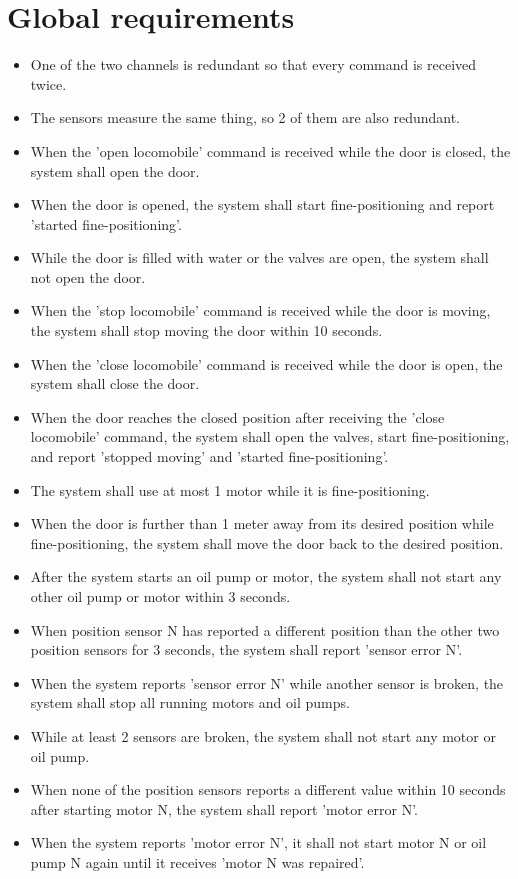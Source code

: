 \documentclass{article}
\begin{document}
\section{Global requirements}
\begin{itemize}
    \item One of the two channels is redundant so that every command is received twice. 
    \item The sensors measure the same thing, so 2 of them are also redundant. 

    \item When the 'open locomobile' command is received while the door is closed,
    the system shall open the door.
    \item When the door is opened, the system shall start fine-positioning and
    report 'started fine-positioning'.
    \item While the door is filled with water or the valves are open, the system 
    shall not open the door.

    \item When the 'stop locomobile' command is received while the door is moving,
    the system shall stop moving the door within 10 seconds.

    \item When the 'close locomobile' command is received while the door is open,
    the system shall close the door.
    \item When the door reaches the closed position after receiving the 
    'close locomobile' command, the system shall open the valves, 
    start fine-positioning, and report 'stopped moving' and 'started fine-positioning'.

    \item The system shall use at most 1 motor while it is fine-positioning.
    \item When the door is further than 1 meter away from its desired position
    while fine-positioning, the system shall move the door back to the desired
    position.

    \item After the system starts an oil pump or motor, the system shall not start
    any other oil pump or motor within 3 seconds.
    \item When position sensor N has reported a different position than the other two
    position sensors for 3 seconds, the system shall report 'sensor error N'.
    \item When the system reports 'sensor error N' while another sensor is broken, the
    system shall stop all running motors and oil pumps.
    \item While at least 2 sensors are broken, the system shall not start any motor or
    oil pump.

    \item When none of the position sensors reports a different value within 10 seconds 
    after starting motor N, the system shall report 'motor error N'.
    \item When the system reports 'motor error N', it shall not start motor N or oil pump
    N again until it receives 'motor N was repaired'.
\end{itemize}
\end{document}
